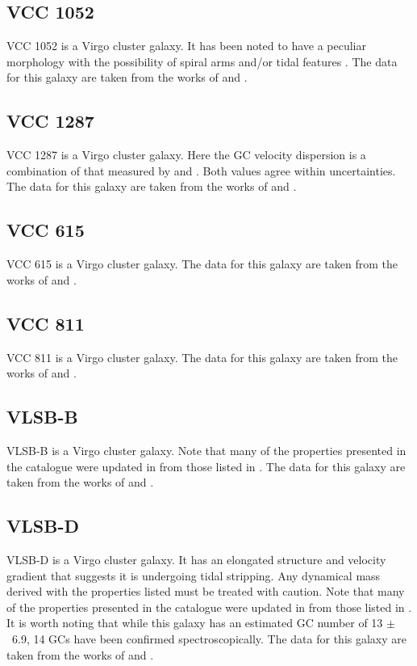 \subsection{VCC 1052}
VCC 1052 is a Virgo cluster galaxy. It has been noted to have a peculiar morphology with the possibility of spiral arms and/or tidal features \citep{Lim2020}. The data for this galaxy are taken from the works of \citet{Lim2020} and \citet{Toloba2023}.

\subsection{VCC 1287}
VCC 1287 is a Virgo cluster galaxy. Here the GC velocity dispersion is a combination of that measured by \citet[33$^{+16}_{-10}$]{Beasley2016} and \citet[39$^{+20}_{-12}$]{Toloba2023}. Both values agree within uncertainties. The data for this galaxy are taken from the works of \citet{Beasley2016, Gannon2020, Gannon2021, Lim2020} and \citet{Toloba2023}.

\subsection{VCC 615}
VCC 615 is a Virgo cluster galaxy. The data for this galaxy are taken from the works of \citet{Lim2020} and \citet{Toloba2023}.

\subsection{VCC 811}
VCC 811 is a Virgo cluster galaxy. The data for this galaxy are taken from the works of \citet{Lim2020} and \citet{Toloba2023}.

\subsection{VLSB-B}
VLSB-B is a Virgo cluster galaxy. Note that many of the properties presented in the catalogue were updated in \cite{Toloba2023} from those listed in \cite{Toloba2018}. The data for this galaxy are taken from the works of \citet{Toloba2018, Lim2020} and \citet{Toloba2023}. 

\subsection{VLSB-D}
VLSB-D is a Virgo cluster galaxy. It has an elongated structure and velocity gradient \citep{Toloba2018} that suggests it is undergoing tidal stripping. Any dynamical mass derived with the properties listed must be treated with caution. Note that many of the properties presented in the catalogue were updated in \cite{Toloba2023} from those listed in \cite{Toloba2018}. It is worth noting that while this galaxy has an estimated GC number of 13 $\pm$~6.9, 14 GCs have been confirmed spectroscopically. The data for this galaxy are taken from the works of \citet{Toloba2018, Lim2020} and \citet{Toloba2023}. 

